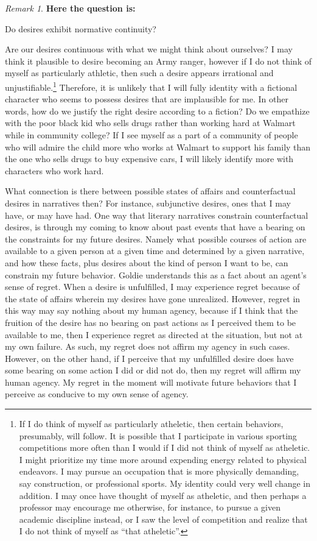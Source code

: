 \documentclass[phdthesis,12pt,final]{wuthesis}
\theoremstyle{definition}
\theoremstyle{definition}
\theoremstyle{definition}
\theoremstyle{definition}
\theoremstyle{remark}
\newtheorem*{remark}{Remark}
\begin{document}
\begin{remark}
\textbf{Here the question is:}

Do desires exhibit normative continuity?
\end{remark}

Are our desires continuous with what we might think about ourselves? I may think it plausible to desire becoming an Army ranger, however if I do not think of myself as particularly athletic, then such a desire appears irrational and unjustifiable.\footnote{If I do think of myself as particularly atheletic, then certain behaviors, presumably, will follow. It is possible that I participate in various sporting competitions more often than I would if I did not think of myself as atheletic. I might prioritize my time more around expending energy related to physical endeavors. I may pursue an occupation that is more physically demanding, say construction, or professional sports. My identity could very well change in addition. I may once have thought of myself as atheletic, and then perhaps a professor may encourage me otherwise, for instance, to pursue a given academic discipline instead, or I saw the level of competition and realize that I do not think of myself as ``that atheletic''.} Therefore, it is unlikely that I will fully identity with a fictional character who seems to possess desires that are implausible for me. In other words, how do we justify the right desire according to a fiction? Do we empathize with the poor black kid who sells drugs rather than working hard at Walmart while in community college? If I see myself as a part of a community of people who will admire the child more who works at Walmart to support his family than the one who sells drugs to buy expensive cars, I will likely identify more with characters who work hard.

What connection is there between possible states of affairs and counterfactual desires in narratives then? For instance, subjunctive desires, ones that I may have, or may have had. One way that literary narratives constrain counterfactual desires, is through my coming to know about past events that have a bearing on the constraints for my future desires. Namely what possible courses of action are available to a given person at a given time and determined by a given narrative, and how these facts, plus desires about the kind of person I want to be, can constrain my future behavior. Goldie understands this as a fact about an agent's sense of regret. When a desire is unfulfilled, I may experience regret because of the state of affairs wherein my desires have gone unrealized. However, regret in this way may say nothing about my human agency, because if I think that the fruition of the desire has no bearing on past actions as I perceived them to be available to me, then I experience regret as directed at the situation, but not at my own failure. As such, my regret does not affirm my agency in such cases. However, on the other hand, if I perceive that my unfulfilled desire does have some bearing on some action I did or did not do, then my regret will affirm my human agency. My regret in the moment will motivate future behaviors that I perceive as conducive to my own sense of agency.
\end{document}

